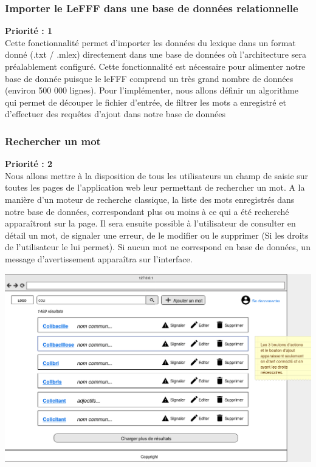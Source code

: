 \documentclass[12pt,a4paper]{article}
\begin{document}
\subsubsection{Importer le LeFFF dans une base de données relationnelle}
\textbf{Priorité : 1} \\ 
Cette fonctionnalité permet d'importer les données du lexique dans un format donné (.txt / .mlex) directement dans une base de données où l'architecture sera préalablement configuré.
Cette fonctionnalité est nécessaire pour alimenter notre base de donnée puisque le leFFF comprend un très grand nombre de données (environ 500 000 lignes).
Pour l'implémenter, nous allons définir un algorithme qui permet de découper le fichier d'entrée, de filtrer les mots a enregistré et d'effectuer des requêtes d'ajout dans notre base de données
\subsubsection{Rechercher un mot}
 \textbf{Priorité : 2}
\\ Nous allons mettre à la disposition de tous les utilisateurs un champ de saisie sur toutes les pages de l'application web leur permettant de rechercher un mot. A la manière d'un moteur de recherche classique, la liste des mots enregistrés dans notre base de données, correspondant plus ou moins à ce qui a été recherché apparaîtront sur la page. Il sera ensuite possible à l'utilisateur de consulter en détail un mot, de signaler une erreur, de le modifier ou le supprimer (Si les droits de l'utilisateur le lui permet). Si aucun mot ne correspond en base de données, un message d'avertissement apparaîtra sur l'interface.
\begin{center}\includegraphics[width=150mm]{img/search_screen.png}\end{center}
\end{document}
